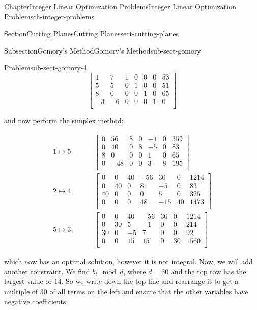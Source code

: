 \documentclass[oneside,10pt,]{book}
\numberwithin{equation}{section}
\newcommand{\amp}{&}
\begin{document}
\begin{chapterptx}{Chapter}{Integer Linear Optimization Problems}{}{Integer Linear Optimization Problems}{}{}{ch-integer-problems}
\begin{sectionptx}{Section}{Cutting Planes}{}{Cutting Planes}{}{}{sect-cutting-planes}
\begin{subsectionptx}{Subsection}{Gomory's Method}{}{Gomory's Method}{}{}{sub-sect-gomory}
\begin{problem}{Problem}{}{sub-sect-gomory-4}
%
\begin{equation*}
\left[\begin{array}{rr|rrrr|r} 1 \amp 7 \amp 1 \amp 0 \amp 0 \amp 0 \amp 53\\ 5 \amp 5 \amp 0 \amp 1 \amp 0 \amp 0 \amp 51\\ 8 \amp 0 \amp 0 \amp 0 \amp 1 \amp 0 \amp 65\\ \hline -3 \amp -6 \amp 0 \amp 0 \amp 0 \amp 1 \amp 0\\ \end{array} \right]
\end{equation*}
%
\par
and now perform the simplex method:%
\par
%
\begin{align*}
1 \mapsto 5\qquad \amp \left[\begin{array}{rr|rrrr|r} 0 \amp 56 \amp 8 \amp 0 \amp -1 \amp 0 \amp 359\\ 0 \amp 40 \amp 0 \amp 8 \amp -5 \amp 0 \amp 83\\ 8 \amp 0 \amp 0 \amp 0 \amp 1 \amp 0 \amp 65\\ \hline 0 \amp -48 \amp 0 \amp 0 \amp 3 \amp 8 \amp 195\\ \end{array} \right] \\
2 \mapsto 4 \qquad \amp \left[\begin{array}{rr|rrrr|r} 0 \amp 0 \amp 40 \amp -56 \amp 30 \amp 0 \amp 1214\\ 0 \amp 40 \amp 0 \amp 8 \amp -5 \amp 0 \amp 83\\ 40 \amp 0 \amp 0 \amp 0 \amp 5 \amp 0 \amp 325\\ \hline 0 \amp 0 \amp 0 \amp 48 \amp -15 \amp 40 \amp 1473\\ \end{array} \right]\\
5 \mapsto 3, \qquad\amp \left[\begin{array}{rr|rrrr|r} 0 \amp 0 \amp 40 \amp -56 \amp 30 \amp 0 \amp 1214\\ 0 \amp 30 \amp 5 \amp -1 \amp 0 \amp 0 \amp 214\\ 30 \amp 0 \amp -5 \amp 7 \amp 0 \amp 0 \amp 92\\ \hline 0 \amp 0 \amp 15 \amp 15 \amp 0 \amp 30 \amp 1560\\ \end{array} \right]
\end{align*}
%
\par
which now has an optimal solution, however it is not integral. Now, we will add another constraint. We find \(b_{i} \mod d\), where \(d=30\) and the top row has the largest value or 14. So we write down the top line and rearrange it to get a multiple of 30 of all terms on the left and ensure that the other variables have negative coefficients:%

\end{problem}
\end{subsectionptx}
\end{sectionptx}
\end{chapterptx}
\end{document}

